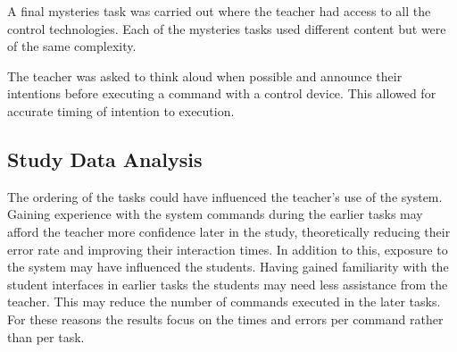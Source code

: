\documentclass[manuscript, review, screen]{acmart}
\begin{document}
A final mysteries task was carried out where the teacher had access to all the control technologies.  
Each of the mysteries tasks used different content but were of the same complexity.  

The teacher was asked to think aloud when possible and announce their intentions before executing a command with a control device.  
This allowed for accurate timing of intention to execution.

\subsection{Study Data Analysis}
\label{subsec:studyanalysis}

The ordering of the tasks could have influenced the teacher's use of the system.
Gaining experience with the system commands during the earlier tasks may afford the teacher more confidence later in the study, theoretically reducing their error rate and improving their interaction times.
In addition to this, exposure to the system may have influenced the students.
Having gained familiarity with the student interfaces in earlier tasks the students may need less assistance from the teacher.
This may reduce the number of commands executed in the later tasks.
For these reasons the results focus on the times and errors per command rather than per task.
\end{document}
